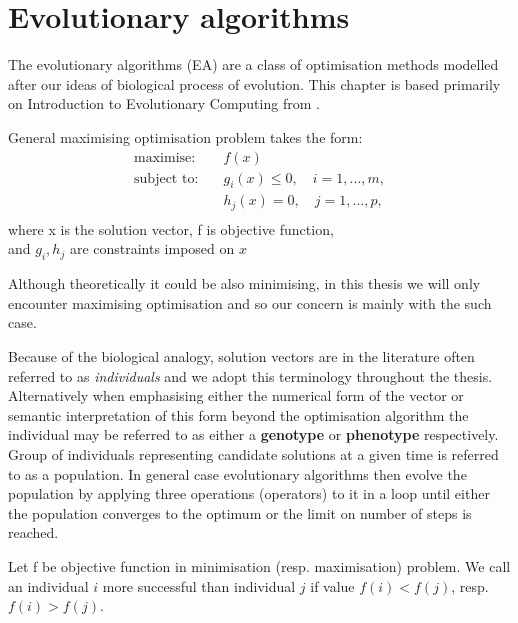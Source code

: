 \chapter{Evolutionary algorithms}
\label{chap:evolution}
The evolutionary algorithms (EA) are a class of optimisation methods modelled after our ideas of biological process of evolution.
This chapter is based primarily on Introduction to Evolutionary  Computing from  \cite{introduction}.
\begin{defn}
General maximising optimisation problem takes the form:
\[
\begin{aligned}
\text{maximise:} \quad & f(x) \\
\text{subject to:} \quad & g_i(x) \le 0, \quad i = 1, \dots, m, \\
& h_j(x) = 0, \quad j = 1, \dots, p, \\
\end{aligned}
\]
where x is the solution vector, f is objective function,\\
and $g_i, h_j $ are constraints imposed on $ x $ \\ 
\end{defn}
 Although theoretically it could be also minimising, in this thesis we will only encounter maximising optimisation and so our concern is mainly with the such case.

Because of the biological analogy, solution vectors are in the literature often referred to as \textit{individuals} and we adopt this terminology throughout the thesis. Alternatively when emphasising either the numerical form of the vector or  semantic interpretation of this form beyond the optimisation algorithm the individual may be referred to as either a \textbf{genotype} or \textbf{phenotype} respectively.\\  
Group of individuals representing candidate solutions at a given time is referred to as a population. In general case evolutionary algorithms then evolve the population by applying three operations (operators) to it in a loop until either the population converges to the optimum or the limit on number of steps is reached. 
\begin{defn}
	Let f be objective function in minimisation (resp. maximisation) problem. We call an individual $ i $ more successful than individual $ j $ if value $ f(i) < f(j) $, resp. $ f(i) > f(j) $. 
\end{defn}
\begin{algorithm}

\caption{Generalised Evolutionary Algorithm \label{generalEvo}}
\end{algorithm}

